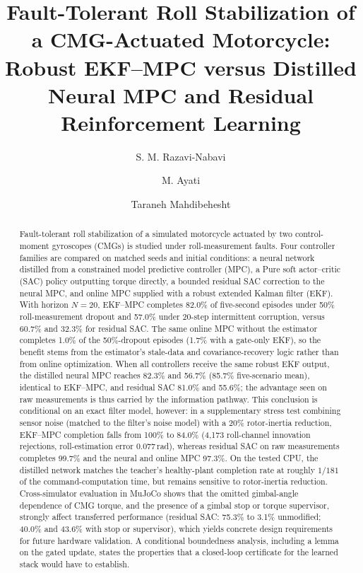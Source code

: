 \documentclass[preprint,12pt,authoryear=false]{elsarticle}
\theoremstyle{remark}\newtheorem{remark}{Remark}
\theoremstyle{plain}\newtheorem{proposition}{Proposition}\newtheorem{lemma}{Lemma}
\theoremstyle{definition}\newtheorem{assumption}{Assumption}
\begin{document}
\begin{frontmatter}

\title{Fault-Tolerant Roll Stabilization of a CMG-Actuated Motorcycle:\\
Robust EKF--MPC versus Distilled Neural MPC and Residual Reinforcement Learning}

\author[inst1]{S. M. Razavi-Nabavi}

\author[inst1]{M. Ayati}

\author[inst1]{Taraneh Mahdibehesht}

\address[inst1]{Advanced Instrumentation Laboratory, School of Mechanical Engineering, University of Tehran, Tehran, Iran}

\begin{abstract}
Fault-tolerant roll stabilization of a simulated motorcycle actuated by two control-moment gyroscopes (CMGs) is studied under roll-measurement faults. Four controller families are compared on matched seeds and initial conditions: a neural network distilled from a constrained model predictive controller (MPC), a Pure soft actor--critic (SAC) policy outputting torque directly, a bounded residual SAC correction to the neural MPC, and online MPC supplied with a robust extended Kalman filter (EKF). With horizon $N=20$, EKF--MPC completes 82.0\% of five-second episodes under 50\% roll-measurement dropout and 57.0\% under 20-step intermittent corruption, versus 60.7\% and 32.3\% for residual SAC. The same online MPC without the estimator completes 1.0\% of the 50\%-dropout episodes (1.7\% with a gate-only EKF), so the benefit stems from the estimator's stale-data and covariance-recovery logic rather than from online optimization. When all controllers receive the same robust EKF output, the distilled neural MPC reaches 82.3\% and 56.7\% (85.7\% five-scenario mean), identical to EKF--MPC, and residual SAC 81.0\% and 55.6\%; the advantage seen on raw measurements is thus carried by the information pathway. This conclusion is conditional on an exact filter model, however: in a supplementary stress test combining sensor noise (matched to the filter's noise model) with a 20\% rotor-inertia reduction, EKF--MPC completion falls from 100\% to 84.0\% (4{,}173 roll-channel innovation rejections, roll-estimation error 0.077\,rad), whereas residual SAC on raw measurements completes 99.7\% and the neural and online MPC 97.3\%. On the tested CPU, the distilled network matches the teacher's healthy-plant completion rate at roughly $1/181$ of the command-computation time, but remains sensitive to rotor-inertia reduction. Cross-simulator evaluation in MuJoCo shows that the omitted gimbal-angle dependence of CMG torque, and the presence of a gimbal stop or torque supervisor, strongly affect transferred performance (residual SAC: 75.3\% to 3.1\% unmodified; 40.0\% and 43.6\% with stop or supervisor), which yields concrete design requirements for future hardware validation. A conditional boundedness analysis, including a lemma on the gated update, states the properties that a closed-loop certificate for the learned stack would have to establish.
\end{abstract}


\end{frontmatter}
\end{document}
